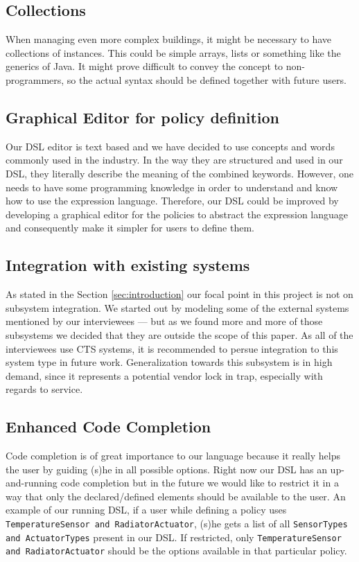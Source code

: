 \subsection{Collections}\label{subsec:collections}
When managing even more complex buildings, it might be necessary to have collections of instances. This could be simple arrays, lists or something like the generics of Java. It might prove difficult to convey the concept to non-programmers, so the actual syntax should be defined together with future users.

\subsection{Graphical Editor for policy definition}\label{subsec:graphicaleditor}
Our DSL editor is text based and we have decided to use concepts and words commonly used in the industry. In the way they are structured and used in our DSL, they literally describe the meaning of the combined keywords. However, one needs to have some programming knowledge in order to understand and know how to use the expression language. Therefore, our DSL could be improved by developing a graphical editor for the policies to abstract the expression language and consequently make it simpler for users to define them.

\subsection{Integration with existing systems}\label{subsec:integration}
As stated in the Section \ref{sec:introduction} our focal point in this project is not on subsystem integration. We started out by modeling some of the external systems mentioned by our interviewees --- but as we found more and more of those subsystems we decided that they are outside the scope of this paper. As all of the interviewees use CTS systems, it is recommended to persue integration to this system type in future work. Generalization towards this subsystem is in high demand, since it represents a potential vendor lock in trap, especially with regards to service.

\subsection{Enhanced Code Completion}\label{subsec:codecompletion}
Code completion is of great importance to our language because it really helps the user by guiding (s)he in all possible options. Right now our DSL has an up-and-running code completion but in the future we would like to restrict it in a way that only the declared/defined elements should be available to the user. An example of our running DSL, if a user while defining a policy uses \texttt{TemperatureSensor and RadiatorActuator}, (s)he gets a list of all \texttt{SensorTypes and ActuatorTypes} present in our DSL. If restricted, only \texttt{TemperatureSensor and RadiatorActuator} should be the options available in that particular policy.

